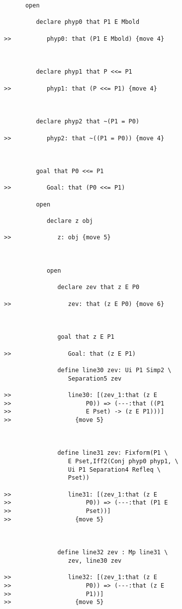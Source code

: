 \documentclass[12pt]{article}
\begin{document}
\begin{verbatim}
      open

         declare phyp0 that P1 E Mbold

>>          phyp0: that (P1 E Mbold) {move 4}



         declare phyp1 that P <<= P1

>>          phyp1: that (P <<= P1) {move 4}



         declare phyp2 that ~(P1 = P0)

>>          phyp2: that ~((P1 = P0)) {move 4}



         goal that P0 <<= P1

>>          Goal: that (P0 <<= P1)

         open

            declare z obj

>>             z: obj {move 5}



            open

               declare zev that z E P0

>>                zev: that (z E P0) {move 6}



               goal that z E P1

>>                Goal: that (z E P1)

               define line30 zev: Ui P1 Simp2 \
                  Separation5 zev

>>                line30: [(zev_1:that (z E
>>                     P0)) => (---:that ((P1
>>                     E Pset) -> (z E P1)))]
>>                  {move 5}



               define line31 zev: Fixform(P1 \
                  E Pset,Iff2(Conj phyp0 phyp1, \
                  Ui P1 Separation4 Refleq \
                  Pset))

>>                line31: [(zev_1:that (z E
>>                     P0)) => (---:that (P1 E
>>                     Pset))]
>>                  {move 5}



               define line32 zev : Mp line31 \
                  zev, line30 zev

>>                line32: [(zev_1:that (z E
>>                     P0)) => (---:that (z E
>>                     P1))]
>>                  {move 5}




\end{verbatim}
\end{document}
